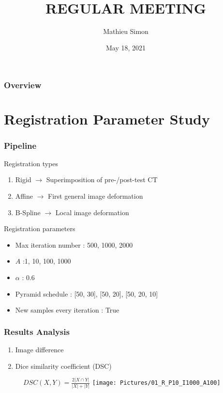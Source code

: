 \documentclass[xcolor=table]{beamer}
\title[Regular Meeting]{
\uppercase{Regular Meeting}
}
\author{Mathieu Simon}
\institute[University of Bern]
{
MSc - Biomedical Engineering \\
University of Bern, Faculty of Medicine \\
\medskip
}
\date{May 18, 2021}
\begin{document}
\begin{frame}
\titlepage
\end{frame}


\begin{frame}
	\frametitle{Overview}
	\tableofcontents
\end{frame}


\section{Registration Parameter Study}

\begin{frame}
	\frametitle{Pipeline}
	Registration types
	\begin{enumerate}
		\item Rigid $\rightarrow$ Superimposition of pre-/post-test \si{\micro}CT
		\item Affine $\rightarrow$ First general image deformation
		\item B-Spline $\rightarrow$ Local image deformation
	\end{enumerate}
	\vfill
	Registration parameters
	\begin{itemize}
		\item Max iteration number : 500, 1000, 2000
		\item $A$ :1, 10, 100, 1000
		\item $\alpha$ : 0.6
		\item Pyramid schedule : [50, 30], [50, 20], [50, 20, 10]
		\item New samples every iteration : True
	\end{itemize}
\end{frame}


\begin{frame}
	\frametitle{Results Analysis}
	\begin{enumerate}
		\item Image difference
		\item Dice similarity coefficient (DSC)
	\end{enumerate}	
	\begin{figure}
		\centering
		$DSC(X,Y) = \frac{2|X \cap Y|}{|X| + |Y|}$
		\texttt{[image: Pictures/01\_R\_P10\_I1000\_A100]}
	\end{figure}
\end{frame}
\end{document}
